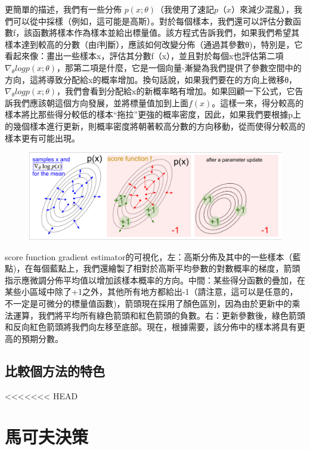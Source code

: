 \documentclass[14pt,a4paper]{report}  %
\begin{document}
更簡單的描述，我們有一些分佈 $p(x;\theta)$（我使用了速記$ p（x）$來減少混亂），我們可以從中採樣（例如，這可能是高斯）。對於每個樣本，我們還可以評估分數函數f，該函數將樣本作為樣本並給出標量值。該方程式告訴我們，如果我們希望其樣本達到較高的分數（由f判斷），應該如何改變分佈（通過其參數θ)，特別是，它看起來像：畫出一些樣本x，評估其分數f（x），並且對於每個x也評估第二項 $\nabla_\theta logp(x;θ)$，那第二項是什麼，它是一個向量-漸變為我們提供了參數空間中的方向，這將導致分配給x的概率增加。換句話說，如果我們要在的方向上微移θ，$\nabla_\theta logp(x;θ)$，我們會看到分配給x的新概率略有增加。如果回顧一下公式，它告訴我們應該朝這個方向發展，並將標量值加到上面$f(x)$。這樣一來，得分較高的樣本將比那些得分較低的樣本“拖拉”更強的概率密度，因此，如果我們要根據p上的幾個樣本進行更新，則概率密度將朝著較高分數的方向移動，從而使得分較高的樣本更有可能出現。\\
\begin{figure}[hbt!]
\begin{center}
\includegraphics[scale=0.4]{figure}
\end{center}
\end{figure}
\qquad score function gradient estimator的可視化，左：高斯分佈及其中的一些樣本（藍點)，在每個藍點上，我們還繪製了相對於高斯平均參數的對數概率的梯度，箭頭指示應微調分佈平均值以增加該樣本概率的方向。中間：某些得分函數的疊加，在某些小區域中除了+1之外，其他所有地方都給出-1（請注意，這可以是任意的，不一定是可微分的標量值函數)，箭頭現在採用了顏色區別，因為由於更新中的乘法運算，我們將平均所有綠色箭頭和紅色箭頭的負數。右：更新參數後，綠色箭頭和反向紅色箭頭將我們向左移至底部。現在，根據需要，該分佈中的樣本將具有更高的預期分數。\\
\newpage
\section{比較個方法的特色}
\newpage
<<<<<<< HEAD
\chapter{馬可夫決策}
\renewcommand{\baselinestretch}{1.0} %
\end{document}

